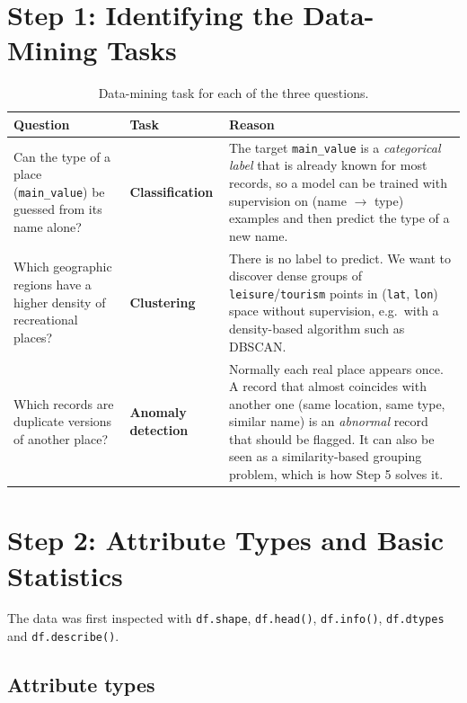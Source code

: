 \documentclass[11pt,a4paper]{article}
\newcommand{\col}[1]{\texttt{#1}}
\begin{document}
\section{Step 1: Identifying the Data-Mining Tasks}

\begin{table}[H]
\centering
\caption{Data-mining task for each of the three questions.}
\begin{tabularx}{\textwidth}{>{\raggedright\arraybackslash}p{4.4cm}>{\raggedright\arraybackslash}p{2.5cm}X}
\toprule
\textbf{Question} & \textbf{Task} & \textbf{Reason} \\
\midrule
Can the type of a place (\col{main\_value}) be guessed from its name alone?
& \textbf{Classification}
& The target \col{main\_value} is a \emph{categorical label} that is already known for most
records, so a model can be trained with supervision on (name $\rightarrow$ type) examples
and then predict the type of a new name. \\
\midrule
Which geographic regions have a higher density of recreational places?
& \textbf{Clustering}
& There is no label to predict. We want to discover dense groups of
\col{leisure}/\col{tourism} points in (\col{lat}, \col{lon}) space without supervision,
e.g.\ with a density-based algorithm such as DBSCAN. \\
\midrule
Which records are duplicate versions of another place?
& \textbf{Anomaly detection}
& Normally each real place appears once. A record that almost coincides with another one
(same location, same type, similar name) is an \emph{abnormal} record that should be flagged.
It can also be seen as a similarity-based grouping problem, which is how Step 5 solves it. \\
\bottomrule
\end{tabularx}
\end{table}

\section{Step 2: Attribute Types and Basic Statistics}

The data was first inspected with \col{df.shape}, \col{df.head()}, \col{df.info()},
\col{df.dtypes} and \col{df.describe()}.

\subsection{Attribute types}
\end{document}
